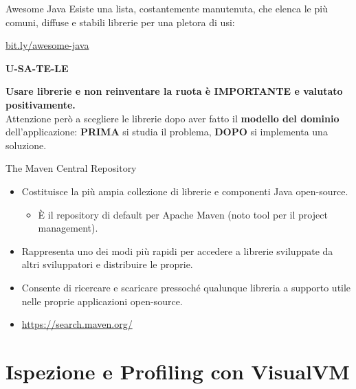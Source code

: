 \documentclass[presentation]{beamer}
\begin{document}
\begin{frame}{Awesome Java}
	Esiste una lista, costantemente manutenuta, che elenca le più comuni, diffuse e stabili librerie per una pletora di usi:
	\begin{center}
		\url{bit.ly/awesome-java}
	\end{center}
	\begin{center}
		\begin{LARGE}\textbf{U-SA-TE-LE}\end{LARGE}
	\end{center}
	\begin{center}
		\textbf{Usare librerie e non reinventare la ruota è \alert{IMPORTANTE} e valutato positivamente.}\\
		Attenzione però a scegliere le librerie dopo aver fatto il \textbf{modello del dominio} dell'applicazione: \textbf{PRIMA} si studia il problema, \textbf{DOPO} si implementa una soluzione.
	\end{center}
\end{frame}

\begin{frame}{The Maven Central Repository}
\begin{itemize}\itemsep10pt
\item Costituisce la più ampia collezione di librerie e componenti Java open-source.
\begin{itemize}
\item È il repository di default per Apache Maven (noto tool per il project management).
\end{itemize}
\item Rappresenta uno dei modi più rapidi per accedere a librerie sviluppate da altri sviluppatori e distribuire le proprie.
\item Consente di ricercare e scaricare pressoché qualunque libreria a supporto utile nelle proprie applicazioni open-source.

\item \url{https://search.maven.org/}
\end{itemize}
\end{frame}


\section{Ispezione e Profiling con VisualVM}
\end{document}
